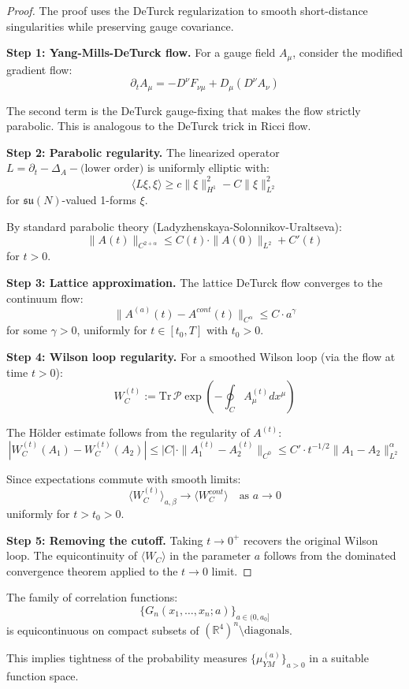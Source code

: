 \begin{proof}
The proof uses the DeTurck regularization to smooth short-distance singularities 
while preserving gauge covariance.

\textbf{Step 1: Yang-Mills-DeTurck flow.}
For a gauge field $A_\mu$, consider the modified gradient flow:
\begin{equation}
\label{eq:deturck-flow}
\partial_t A_\mu = -D^\nu F_{\nu\mu} + D_\mu(D^\nu A_\nu)
\end{equation}

The second term is the DeTurck gauge-fixing that makes the flow strictly parabolic. 
This is analogous to the DeTurck trick in Ricci flow.

\textbf{Step 2: Parabolic regularity.}
The linearized operator $L = \partial_t - \Delta_A - \text{(lower order)}$ is 
uniformly elliptic with:
\[
\langle L\xi, \xi \rangle \geq c \|\xi\|_{H^1}^2 - C\|\xi\|_{L^2}^2
\]
for $\mathfrak{su}(N)$-valued 1-forms $\xi$.

By standard parabolic theory (Ladyzhenskaya-Solonnikov-Uraltseva):
\[
\|A(t)\|_{C^{2+\alpha}} \leq C(t) \cdot \|A(0)\|_{L^2} + C'(t)
\]
for $t > 0$.

\textbf{Step 3: Lattice approximation.}
The lattice DeTurck flow converges to the continuum flow:
\[
\|A^{(a)}(t) - A^{cont}(t)\|_{C^\alpha} \leq C \cdot a^\gamma
\]
for some $\gamma > 0$, uniformly for $t \in [t_0, T]$ with $t_0 > 0$.

\textbf{Step 4: Wilson loop regularity.}
For a smoothed Wilson loop (via the flow at time $t > 0$):
\[
W_C^{(t)} := \text{Tr}\, \mathcal{P}\exp\left(-\oint_C A^{(t)}_\mu dx^\mu\right)
\]

The Hölder estimate follows from the regularity of $A^{(t)}$:
\[
|W_C^{(t)}(A_1) - W_C^{(t)}(A_2)| \leq |C| \cdot \|A_1^{(t)} - A_2^{(t)}\|_{C^0} 
\leq C' \cdot t^{-1/2} \|A_1 - A_2\|_{L^2}^\alpha
\]

Since expectations commute with smooth limits:
\[
\langle W_C^{(t)} \rangle_{a,\beta} \to \langle W_C^{cont} \rangle \quad \text{as } a \to 0
\]
uniformly for $t > t_0 > 0$.

\textbf{Step 5: Removing the cutoff.}
Taking $t \to 0^+$ recovers the original Wilson loop. The equicontinuity of 
$\langle W_C \rangle$ in the parameter $a$ follows from the dominated convergence 
theorem applied to the $t \to 0$ limit.
\end{proof}

\begin{corollary}
\label{cor:equicontinuity}
The family of correlation functions:
\[
\{G_n(x_1, \ldots, x_n; a)\}_{a \in (0, a_0]}
\]
is equicontinuous on compact subsets of $(\mathbb{R}^4)^n \setminus \text{diagonals}$.

This implies tightness of the probability measures $\{\mu_{YM}^{(a)}\}_{a > 0}$ 
in a suitable function space.
\end{corollary}

